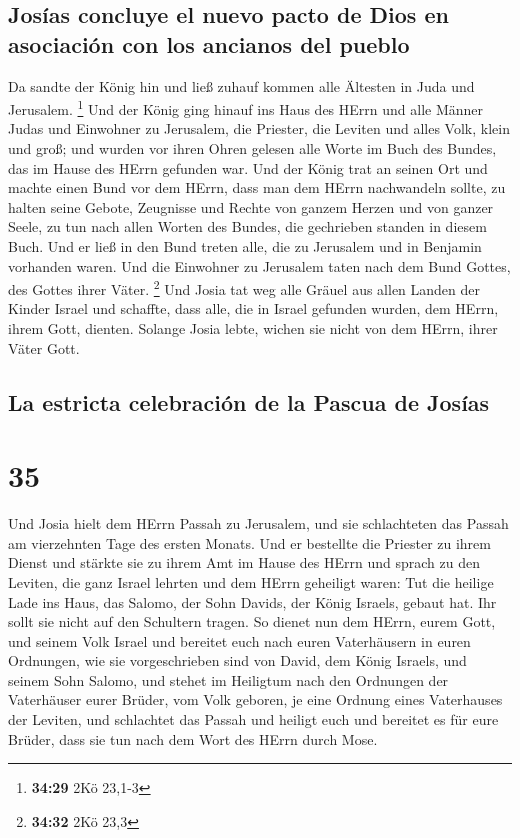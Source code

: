 \hypertarget{josuxedas-concluye-el-nuevo-pacto-de-dios-en-asociaciuxf3n-con-los-ancianos-del-pueblo}{%
\subsection{Josías concluye el nuevo pacto de Dios en asociación con los
ancianos del
pueblo}\label{josuxedas-concluye-el-nuevo-pacto-de-dios-en-asociaciuxf3n-con-los-ancianos-del-pueblo}}

 Da sandte der König hin und ließ zuhauf kommen alle
Ältesten in Juda und Jerusalem. \footnote{\textbf{34:29} 2Kö 23,1-3}
 Und der König ging hinauf ins Haus des HErrn und alle
Männer Judas und Einwohner zu Jerusalem, die Priester, die Leviten und
alles Volk, klein und groß; und wurden vor ihren Ohren gelesen alle
Worte im Buch des Bundes, das im Hause des HErrn gefunden war.
 Und der König trat an seinen Ort und machte einen Bund
vor dem HErrn, dass man dem HErrn nachwandeln sollte, zu halten seine
Gebote, Zeugnisse und Rechte von ganzem Herzen und von ganzer Seele, zu
tun nach allen Worten des Bundes, die gechrieben standen in diesem Buch.
 Und er ließ in den Bund treten alle, die zu Jerusalem
und in Benjamin vorhanden waren. Und die Einwohner zu Jerusalem taten
nach dem Bund Gottes, des Gottes ihrer Väter. \footnote{\textbf{34:32}
  2Kö 23,3}  Und Josia tat weg alle Gräuel aus allen
Landen der Kinder Israel und schaffte, dass alle, die in Israel gefunden
wurden, dem HErrn, ihrem Gott, dienten. Solange Josia lebte, wichen sie
nicht von dem HErrn, ihrer Väter Gott.

\hypertarget{la-estricta-celebraciuxf3n-de-la-pascua-de-josuxedas}{%
\subsection{La estricta celebración de la Pascua de
Josías}\label{la-estricta-celebraciuxf3n-de-la-pascua-de-josuxedas}}

\hypertarget{section-34}{%
\section{35}\label{section-34}}

 Und Josia hielt dem HErrn Passah zu Jerusalem, und sie
schlachteten das Passah am vierzehnten Tage des ersten Monats.
 Und er bestellte die Priester zu ihrem Dienst und stärkte
sie zu ihrem Amt im Hause des HErrn  und sprach zu den
Leviten, die ganz Israel lehrten und dem HErrn geheiligt waren: Tut die
heilige Lade ins Haus, das Salomo, der Sohn Davids, der König Israels,
gebaut hat. Ihr sollt sie nicht auf den Schultern tragen. So dienet nun
dem HErrn, eurem Gott, und seinem Volk Israel  und
bereitet euch nach euren Vaterhäusern in euren Ordnungen, wie sie
vorgeschrieben sind von David, dem König Israels, und seinem Sohn
Salomo,  und stehet im Heiligtum nach den Ordnungen der
Vaterhäuser eurer Brüder, vom Volk geboren, je eine Ordnung eines
Vaterhauses der Leviten,  und schlachtet das Passah und
heiligt euch und bereitet es für eure Brüder, dass sie tun nach dem Wort
des HErrn durch Mose.

